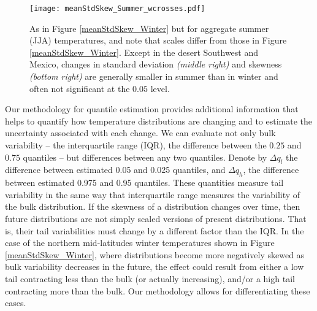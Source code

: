 \documentclass{ametsoc}
\newcommand\smallfigwidth{\columnwidth}
\begin{document}
\begin{figure}[ht]
\centerline{\texttt{[image: meanStdSkew\_Summer\_wcrosses.pdf]}}
\caption{\small{As in Figure \ref{meanStdSkew_Winter} but for aggregate summer (JJA) temperatures, and note that scales differ from those in Figure \ref{meanStdSkew_Winter}. Except in the desert Southwest and Mexico, changes in standard deviation \emph{(middle right)} and skewness \emph{(bottom right)} are generally smaller in summer than in winter and often not significant at the $0.05$ level.}}
\label{meanStdSkew_Summer}
\end{figure}




Our methodology for quantile estimation provides additional information that helps to
 quantify how temperature distributions are changing and to estimate the uncertainty associated with each change. 
We can evaluate not only bulk variability  -- the interquartile range (IQR), the difference between the $0.25$ and $0.75$ quantiles -- but differences between any two quantiles. 
{Denote by $\Delta q_{l}$ the difference between estimated 0.05 and 0.025 quantiles,  and $\Delta q_{h}$, the difference between estimated 0.975 and 0.95 quantiles.
These quantities measure tail variability in the same way that interquartile range measures the variability of the bulk distribution.
If the skewness of a distribution changes over time, then future distributions are not simply scaled versions of present distributions. That is, their tail variabilities must change by a different factor than the IQR.
  In the case of the northern mid-latitudes winter temperatures shown in Figure \ref{meanStdSkew_Winter}, where distributions become more negatively skewed as bulk variability decreases in the future, the effect could result from either a low tail contracting less than the bulk (or actually increasing), and/or a high tail contracting more than the bulk. Our methodology allows for differentiating these cases.}
\end{document}
